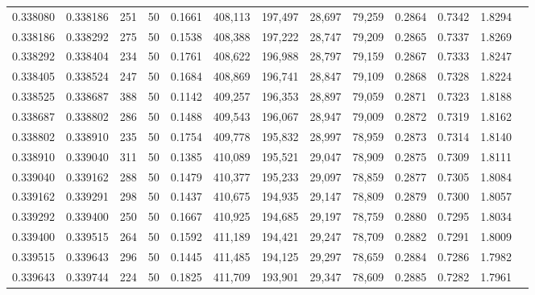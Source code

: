 \begin{tabular}{rrrrrrrrrrrrr}
0.338080 & 0.338186 &   251 &  50 &                                     0.1661 & 408,113 & 197,497 &  28,697 &  79,259 & 0.2864 & 0.7342 & 1.8294 \\
0.338186 & 0.338292 &   275 &  50 &                                     0.1538 & 408,388 & 197,222 &  28,747 &  79,209 & 0.2865 & 0.7337 & 1.8269 \\
0.338292 & 0.338404 &   234 &  50 &                                     0.1761 & 408,622 & 196,988 &  28,797 &  79,159 & 0.2867 & 0.7333 & 1.8247 \\
0.338405 & 0.338524 &   247 &  50 &                                     0.1684 & 408,869 & 196,741 &  28,847 &  79,109 & 0.2868 & 0.7328 & 1.8224 \\
0.338525 & 0.338687 &   388 &  50 &                                     0.1142 & 409,257 & 196,353 &  28,897 &  79,059 & 0.2871 & 0.7323 & 1.8188 \\
0.338687 & 0.338802 &   286 &  50 &                                     0.1488 & 409,543 & 196,067 &  28,947 &  79,009 & 0.2872 & 0.7319 & 1.8162 \\
0.338802 & 0.338910 &   235 &  50 &                                     0.1754 & 409,778 & 195,832 &  28,997 &  78,959 & 0.2873 & 0.7314 & 1.8140 \\
0.338910 & 0.339040 &   311 &  50 &                                     0.1385 & 410,089 & 195,521 &  29,047 &  78,909 & 0.2875 & 0.7309 & 1.8111 \\
0.339040 & 0.339162 &   288 &  50 &                                     0.1479 & 410,377 & 195,233 &  29,097 &  78,859 & 0.2877 & 0.7305 & 1.8084 \\
0.339162 & 0.339291 &   298 &  50 &                                     0.1437 & 410,675 & 194,935 &  29,147 &  78,809 & 0.2879 & 0.7300 & 1.8057 \\
0.339292 & 0.339400 &   250 &  50 &                                     0.1667 & 410,925 & 194,685 &  29,197 &  78,759 & 0.2880 & 0.7295 & 1.8034 \\
0.339400 & 0.339515 &   264 &  50 &                                     0.1592 & 411,189 & 194,421 &  29,247 &  78,709 & 0.2882 & 0.7291 & 1.8009 \\
0.339515 & 0.339643 &   296 &  50 &                                     0.1445 & 411,485 & 194,125 &  29,297 &  78,659 & 0.2884 & 0.7286 & 1.7982 \\
0.339643 & 0.339744 &   224 &  50 &                                     0.1825 & 411,709 & 193,901 &  29,347 &  78,609 & 0.2885 & 0.7282 & 1.7961 \\

\end{tabular}
